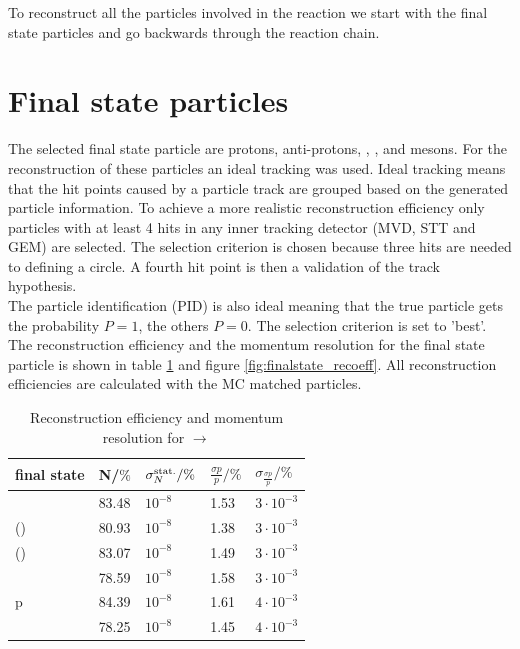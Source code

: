 To reconstruct all the particles involved in the reaction we start with the final state particles and go backwards through the reaction chain.

\section{Final state particles}
	The selected final state particle are protons, anti-protons, \piminus, \piplus, \kminus and \kplus mesons.
	For the reconstruction of these particles an ideal tracking was used.
	Ideal tracking means that the hit points caused by a particle track are grouped based on the generated particle information. 
	To achieve a more realistic reconstruction efficiency only particles with at least 4 hits in any inner tracking detector (MVD, STT and GEM)
	are selected.
	The selection criterion is chosen because three hits are needed to defining a circle.
	A fourth hit point is then a validation of the track hypothesis.\\
	The particle identification (PID) is also ideal meaning that the true particle gets the probability $P=1$, the others $P=0$. 
	The selection criterion is set to 'best'.\vspace{11pt} \\
	The reconstruction efficiency and the momentum resolution for the final state particle is shown in table \ref{tab:finalstate_recoeff} and figure \ref{fig:finalstate_recoeff}.
	All reconstruction efficiencies are calculated with the MC matched particles.
	
	\begin{table}
		\centering
		\caption{\propose Reconstruction efficiency and momentum resolution for \pbarpSystem $\rightarrow$ \excitedcascade \anticascade}
		\label{tab:finalstate_recoeff}
		\begin{tabular}{lllll}
			\hline
			final state & N/$\%$ & $\sigma_N^{\textnormal{stat.}}/\%$ &$\frac{\sigma p}{p}/\%$ & $\sigma_\frac{\sigma p}{p}/\%$ \\
			\hline
			\hline
			\piminus & 83.48 & $10^{-8}$& 1.53 & $3\cdot 10^{-3}$\\
			\piplusone(\anticascade) &  80.93& $10^{-8}$& 1.38 & $3\cdot 10^{-3}$ \\
			\piplustwo(\alam) &  83.07& $10^{-8}$&1.49 & $3\cdot 10^{-3}$\\
			\kminus&  78.59& $10^{-8}$& 1.58 & $3\cdot 10^{-3}$\\
			p &  84.39& $10^{-8}$& 1.61 & $4\cdot 10^{-3}$\\
			\antiproton & 78.25 &$10^{-8}$& 1.45 & $4\cdot 10^{-3}$\\\hline
			 
		\end{tabular}
	\end{table}
	
